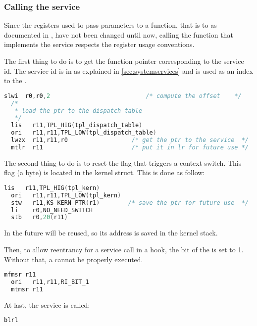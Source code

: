 \subsubsection{Calling the service}

Since the registers used to pass parameters to a function, that is  to  as documented in \cite{PPCeabi}, have not been changed until now, calling the function that implements the service respects the register usage conventions.

The first thing to do is to get the function pointer corresponding to the service id. The service id is in  as explained in \ref{sec:systemservices} and is used as an index to the .

\begin{lstlisting}[language=C]
  slwi  r0,r0,2                           /* compute the offset    */
  /*
   * load the ptr to the dispatch table
   */
  lis   r11,TPL_HIG(tpl_dispatch_table)     
  ori   r11,r11,TPL_LOW(tpl_dispatch_table)
  lwzx  r11,r11,r0                  /* get the ptr to the service  */
  mtlr  r11                         /* put it in lr for future use */
\end{lstlisting}

The second thing to do is to reset the  flag that triggers a context switch. This flag (a byte) is located in the  kernel struct. This is done as follow:

\begin{lstlisting}[language=C]
  lis   r11,TPL_HIG(tpl_kern)
  ori   r11,r11,TPL_LOW(tpl_kern)
  stw   r11,KS_KERN_PTR(r1)        /* save the ptr for future use  */
  li    r0,NO_NEED_SWITCH
  stb   r0,20(r11)
\end{lstlisting}

In the future  will be reused, so its address is saved in the kernel stack.

Then, to allow reentrancy for a service call in a hook, the  bit of the  is set to 1. Without that, a  cannot be  properly executed.

\begin{lstlisting}[language=C]
  mfmsr r11
  ori   r11,r11,RI_BIT_1
  mtmsr r11
\end{lstlisting}

At last, the service is called:

\begin{lstlisting}[language=C]
  blrl
\end{lstlisting}


